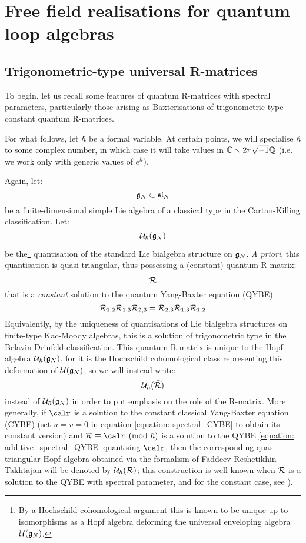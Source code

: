 \section{Free field realisations for quantum loop algebras}
    \subsection{Trigonometric-type universal R-matrices}
        To begin, let us recall some features of quantum R-matrices with spectral parameters, particularly those arising as Baxterisations of trigonometric-type constant quantum R-matrices. 
    
        For what follows, let $\hbar$ be a formal variable. At certain points, we will specialise $\hbar$ to some complex number, in which case it will take values in $\mathbb{C} \smallsetminus 2\pi \sqrt{-1} \mathbb{Q}$ (i.e. we work only with generic values of $e^{\hbar}$).
        
        Again, let:
            $$\mathfrak{g}_N \subset \mathfrak{sl}_N$$
        be a finite-dimensional simple Lie algebra of a classical type in the Cartan-Killing classification. Let:
            $$\mathcal{U}_{\hbar}(\mathfrak{g}_N)$$
        be the\footnote{By a Hochschild-cohomological argument this is known to be unique up to isomorphisms as a Hopf algebra deforming the universal enveloping algebra $\mathcal{U}(\mathfrak{g}_N)$.} quantisation of the standard Lie bialgebra structure on $\mathfrak{g}_N$. \textit{A priori}, this quantisation is quasi-triangular, thus possessing a (constant) quantum R-matrix:
            $$\bar{\mathcal{R}}$$
        that is a \textit{constant} solution to the quantum Yang-Baxter equation (QYBE)
            \begin{equation} \label{equation: constant_QYBE}
                \mathcal{R}_{1, 2} \mathcal{R}_{1, 3} \mathcal{R}_{2, 3} = \mathcal{R}_{2, 3} \mathcal{R}_{1, 3} \mathcal{R}_{1, 2}
            \end{equation}
        Equivalently, by the uniqueness of quantisations of Lie bialgebra structures on finite-type Kac-Moody algebras, this is a solution of trigonometric type in the Belavin-Drinfeld classification. This quantum R-matrix is unique to the Hopf algebra $\mathcal{U}_{\hbar}(\mathfrak{g}_N)$, for it is the Hochschild cohomological class representing this deformation of $\mathcal{U}(\mathfrak{g}_N)$, so we will instead write:
            $$\mathcal{U}_{\hbar}(\bar{\mathcal{R}})$$
        instead of $\mathcal{U}_{\hbar}(\mathfrak{g}_N)$ in order to put emphasis on the role of the R-matrix. More generally, if $\calr$ is a solution to the constant classical Yang-Baxter equation (CYBE) (set $u = v = 0$ in equation \eqref{equation: spectral_CYBE} to obtain its constant version) and $\calR \equiv \calr \pmod{\hbar}$ is a solution to the QYBE \eqref{equation: additive_spectral_QYBE} quantising $\calr$, then the corresponding quasi-triangular Hopf algebra obtained via the formalism of Faddeev-Reshetikhin-Takhtajan will be denoted by $\mathcal{U}_{\hbar}(\mathcal{R})$; this construction is well-known when $\mathcal{R}$ is a solution to the QYBE with spectral parameter, and for the constant case, see \cite{gautam_rupert_wendlandt_R_matrix_presentation_for_finite_QUEs}).
    
